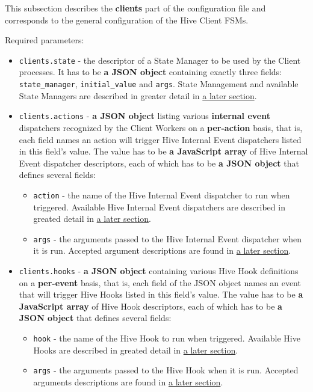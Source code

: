 \documentclass[a4paper]{article}
\begin{document}
This subsection describes the \textbf{clients} part of the configuration file and corresponds to the general configuration of the Hive Client FSMs.

\noindent
Required parameters:


\begin{itemize}
\item \texttt{clients.state} - the descriptor of a State Manager to be used by the Client processes. It has to be \textbf{a JSON object} containing exactly three fields: \texttt{state\_manager}, \texttt{initial\_value} and \texttt{args}. State Management and available State Managers are described in greater detail in \hyperref[sec-7-1-5]{a later section}.
\end{itemize}

\label{ref-events_config}

\begin{itemize}
\item \texttt{clients.actions} - \textbf{a JSON object} listing various \textbf{internal event} dispatchers recognized by the Client Workers on a \textbf{per-action} basis, that is, each field names an action will trigger Hive Internal Event dispatchers listed in this field's value. The value has to be \textbf{a JavaScript array} of Hive Internal Event dispatcher descriptors, each of which has to be \textbf{a JSON object} that defines several fields:
\begin{itemize}
\item \texttt{action} - the name of the Hive Internal Event dispatcher to run when triggered. Available Hive Internal Event dispatchers are described in greated detail in \hyperref[sec-8-3]{a later section}.
\item \texttt{args} - the arguments passed to the Hive Internal Event dispatcher when it is run. Accepted argument descriptions are found in \hyperref[sec-8-3]{a later section}.
\end{itemize}
\end{itemize}

\label{ref-hooks_config}

\begin{itemize}
\item \texttt{clients.hooks} - \textbf{a JSON object} containing various Hive Hook definitions on a \textbf{per-event} basis, that is, each field of the JSON object names an event that will trigger Hive Hooks listed in this field's value. The value has to be \textbf{a JavaScript array} of Hive Hook descriptors, each of which has to be \textbf{a JSON object} that defines several fields:
\begin{itemize}
\item \texttt{hook} - the name of the Hive Hook to run when triggered. Available Hive Hooks are described in greated detail in \hyperref[sec-8-2]{a later section}.
\item \texttt{args} - the arguments passed to the Hive Hook when it is run. Accepted arguments descriptions are found in \hyperref[sec-8-2]{a later section}.
\end{itemize}
\end{itemize}
\end{document}
